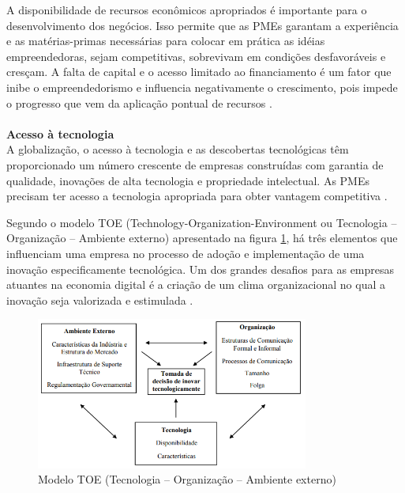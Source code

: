 A disponibilidade de recursos econômicos apropriados é importante para o desenvolvimento dos negócios. Isso permite que as PMEs garantam a experiência e as matérias-primas necessárias para colocar em prática as idéias empreendedoras, sejam competitivas, sobrevivam em condições desfavoráveis e cresçam. A falta de capital e o acesso limitado ao financiamento é um fator que inibe o empreendedorismo e influencia negativamente o crescimento, pois impede o progresso que vem da aplicação pontual de recursos \cite{ligthelma.a.&cantm.c2002}.
\\
\\
\textbf{Acesso à tecnologia}
\\

A globalização, o acesso à tecnologia e as descobertas tecnológicas têm proporcionado um número crescente de empresas construídas com garantia de qualidade, inovações de alta tecnologia e propriedade intelectual. As PMEs precisam ter acesso a tecnologia apropriada para obter vantagem competitiva \cite{thandekaruthkunene2008}. 

Segundo o modelo TOE (Technology-Organization-Environment ou Tecnologia –
Organização – Ambiente externo) apresentado na figura \ref{fig:inovacaotec}, há três elementos que influenciam uma empresa no processo de adoção e implementação de uma inovação especificamente tecnológica. Um dos grandes desafios para as empresas atuantes na economia digital é a criação
de um clima organizacional no qual a inovação seja valorizada e estimulada \cite{rosanasantarosa2016}. 

\begin{figure}[hbt!]
 \centering
  \includegraphics[width=0.8\textwidth]{./fig/inovacaotec}
 \caption{Modelo TOE (Tecnologia – Organização – Ambiente externo) \cite{rosanasantarosa2016}}
 \label{fig:inovacaotec}
\end{figure}


